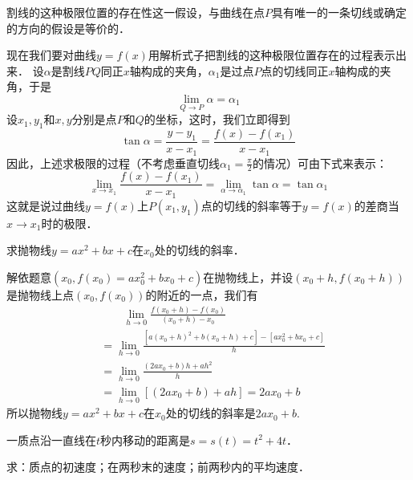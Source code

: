 割线的这种极限位置的存在性这一假设，与曲线在点$P$具有唯一的一条切线或确定的方向的假设是等价的．

现在我们要对曲线$y=f(x)$用解析式子把割线的这种极限位置存在的过程表示出来．
设$\alpha$是割线$PQ$同正$x$轴构成的夹角，$\alpha_1$是过点$P$点的切线同正$x$轴构成的夹角，于是
\[\lim_{Q\to P}\alpha=\alpha_1\]
设$x_1,y_1$和$x,y$分别是点$P$和$Q$的坐标，这时，我们立即得到
\[\tan\alpha=\frac{y-y_1}{x-x_1}=\frac{f(x)-f(x_1)}{x-x_1}\]
因此，上述求极限的过程（不考虑垂直切线$\alpha_1=\frac{\pi}{2}$的情况）可由下式来表示：
\[\lim_{x\to x_1}\frac{f(x)-f(x_1)}{x-x_1}=\lim_{\alpha\to \alpha_1}\tan\alpha=\tan\alpha_1\]
这就是说过曲线$y=f(x)$上$P(x_1,y_1)$点的切线的斜率等于$y=f(x)$的差商当$x\to x_1$时的极限．

\begin{example}
    求抛物线$y=ax^2+bx+c$在$x_0$处的切线的斜率．
\end{example}

\begin{solution}
    解依题意$(x_0,f(x_0)=ax_0^2+bx_0+c)$在抛物线上，并设$(x_0+h,f(x_0+h))$是抛物线上点$(x_0,f(x_0))$的附近的一点，我们有
\begin{align*}
&\qquad \lim_{h\to 0}\frac{f(x_0+h)-f(x_0)}{(x_0+h)-x_0}\\
&=\lim_{h\to 0}\frac{[a(x_0+h)^2+b(x_0+h)+c]-[ax^2_0+bx_0+c]}{h}    \\
&=\lim_{h\to 0}\frac{(2ax_0+b)h+ah^2}{h}\\
&=\lim_{h\to 0}[(2ax_0+b)+ah]=2ax_0+b
\end{align*}
所以抛物线$y=ax^2+bx+c$在$x_0$处的切线的斜率是$2ax_0+b$.
\end{solution}

\begin{example}
    一质点沿一直线在$t$秒内移动的距离是$s=s(t)=t^2+4t$．
    
    求：质点的初速度；在两秒末的速度；前两秒内的平均速度．
\end{example}


